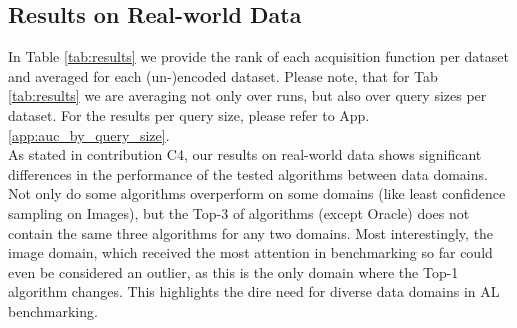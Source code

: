 \documentclass[]{article}
\begin{document}
\subsection{Results on Real-world Data}
In Table \ref{tab:results} we provide the rank of each acquisition function per dataset and averaged for each (un-)encoded dataset. 
Please note, that for Tab \ref{tab:results} we are averaging not only over runs, but also over query sizes per dataset. 
For the results per query size, please refer to App. \ref{app:auc_by_query_size}. \\
As stated in contribution C4, our results on real-world data shows significant differences in the performance of the tested algorithms between data domains.
Not only do some algorithms overperform on some domains (like least confidence sampling on Images), but the Top-3 of algorithms (except Oracle) does not contain the same three algorithms for any two domains.
Most interestingly, the image domain, which received the most attention in benchmarking so far could even be considered an outlier, as this is the only domain where the Top-1 algorithm changes.
This highlights the dire need for diverse data domains in AL benchmarking. \\ [1mm]
\end{document}
